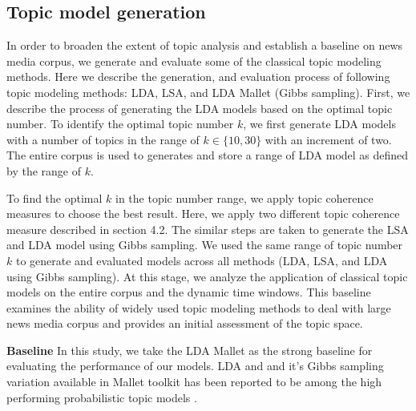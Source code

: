 \subsection{Topic model generation}
In order to broaden the extent of topic analysis and establish a baseline on news media corpus, we generate and evaluate some of the classical topic modeling methods. Here we describe the generation, and evaluation process of following topic modeling methods: LDA, LSA, and LDA Mallet (Gibbs sampling). 
First, we describe the process of generating the LDA models based on the optimal topic number. To identify the optimal topic number $k$,  we first generate LDA models with a number of topics in the range of $k \in \{10, 30\}$ with an increment of two. The entire corpus is used to generates and store a range of  LDA model as defined by the range of $k$.

To find the optimal $k$ in the topic number range, we apply topic coherence measures to choose the best result. Here, we apply two different topic coherence measure described in section 4.2. The similar steps are taken to generate the LSA and LDA model using Gibbs sampling. We used the same range of topic number $k$ to generate and evaluated models across all methods (LDA, LSA, and LDA using Gibbs sampling). 
At this stage, we analyze the application of classical topic models on the entire corpus and the dynamic time windows. This baseline examines the ability of widely used topic modeling methods to deal with large news media corpus and provides an initial assessment of the topic space.

\textbf{Baseline} In this study, we take the LDA Mallet as the strong baseline for evaluating the performance of our models. LDA and and it's Gibbs sampling variation available in Mallet toolkit has been reported to be among the high performing probabilistic topic models \cite{Griffiths, Greene2016}.  

